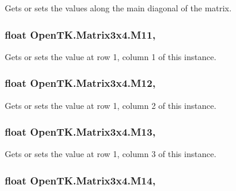 Gets or sets the values along the main diagonal of the matrix. 

\hypertarget{struct_open_t_k_1_1_matrix3x4_a3794b6741bc8614346f875f67b55c029}{
\subsubsection[{M11}]{\setlength{\rightskip}{0pt plus 5cm}float Open\-T\-K.\-Matrix3x4.\-M11\hspace{0.3cm}{\ttfamily [get]}, {\ttfamily [set]}}}\label{struct_open_t_k_1_1_matrix3x4_a3794b6741bc8614346f875f67b55c029}


Gets or sets the value at row 1, column 1 of this instance. 

\hypertarget{struct_open_t_k_1_1_matrix3x4_aa407505147c8711c5602112d0b3afa7b}{
\subsubsection[{M12}]{\setlength{\rightskip}{0pt plus 5cm}float Open\-T\-K.\-Matrix3x4.\-M12\hspace{0.3cm}{\ttfamily [get]}, {\ttfamily [set]}}}\label{struct_open_t_k_1_1_matrix3x4_aa407505147c8711c5602112d0b3afa7b}


Gets or sets the value at row 1, column 2 of this instance. 

\hypertarget{struct_open_t_k_1_1_matrix3x4_af186eaaca4f85a6d8aeb7cd040005352}{
\subsubsection[{M13}]{\setlength{\rightskip}{0pt plus 5cm}float Open\-T\-K.\-Matrix3x4.\-M13\hspace{0.3cm}{\ttfamily [get]}, {\ttfamily [set]}}}\label{struct_open_t_k_1_1_matrix3x4_af186eaaca4f85a6d8aeb7cd040005352}


Gets or sets the value at row 1, column 3 of this instance. 

\hypertarget{struct_open_t_k_1_1_matrix3x4_a85305bf70db9481d023cdf0b8eb26482}{
\subsubsection[{M14}]{\setlength{\rightskip}{0pt plus 5cm}float Open\-T\-K.\-Matrix3x4.\-M14\hspace{0.3cm}{\ttfamily [get]}, {\ttfamily [set]}}}\label{struct_open_t_k_1_1_matrix3x4_a85305bf70db9481d023cdf0b8eb26482}


